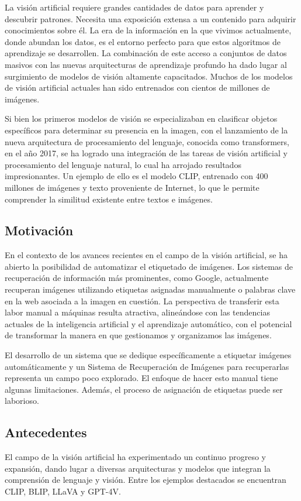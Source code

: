 La visi\'on artificial requiere grandes cantidades de datos para aprender y descubrir patrones. Necesita una exposici\'on extensa a un contenido para adquirir conocimientos sobre \'el. La era de la informaci\'on en la que vivimos actualmente, donde abundan los datos, es el entorno perfecto para que estos algoritmos de aprendizaje se desarrollen. La combinaci\'on de este acceso a conjuntos de datos masivos con las nuevas arquitecturas de aprendizaje profundo ha dado lugar al surgimiento de modelos de visi\'on altamente capacitados. Muchos de los modelos de visi\'on artificial actuales han sido entrenados con cientos de millones de im\'agenes.

Si bien los primeros modelos de visi\'on se especializaban en clasificar objetos espec\'ificos para determinar su presencia en la imagen, con el lanzamiento de la nueva arquitectura de procesamiento del lenguaje, conocida como transformers, en el a\~no 2017, se ha logrado una integraci\'on de las tareas de visi\'on artificial y procesamiento del lenguaje natural, lo cual ha arrojado resultados impresionantes. Un ejemplo de ello es el modelo CLIP, entrenado con 400 millones de im\'agenes y texto proveniente de Internet, lo que le permite comprender la similitud existente entre textos e im\'agenes.

\subsection*{Motivaci\'on}
En el contexto de los avances recientes en el campo de la visi\'on artificial, se ha abierto la posibilidad de automatizar el etiquetado de im\'agenes. Los sistemas de recuperaci\'on de informaci\'on m\'as prominentes, como Google, actualmente recuperan im\'agenes utilizando etiquetas asignadas manualmente o palabras clave en la web asociada a la imagen en cuesti\'on. La perspectiva de transferir esta labor manual a m\'aquinas resulta atractiva, aline\'andose con las tendencias actuales de la inteligencia artificial y el aprendizaje autom\'atico, con el potencial de transformar la manera en que gestionamos y organizamos las im\'agenes.

El desarrollo de un sistema que se dedique espec\'ificamente a etiquetar im\'agenes autom\'aticamente y un Sistema de Recuperaci\'on de Im\'agenes para recuperarlas representa un campo poco explorado. El enfoque de hacer esto manual tiene algunas limitaciones. Adem\'as, el proceso de asignaci\'on de etiquetas puede ser laborioso.

\subsection*{Antecedentes}
El campo de la visi\'on artificial ha experimentado un continuo progreso y expansi\'on, dando lugar a diversas arquitecturas y modelos que integran la comprensi\'on de lenguaje y visi\'on. Entre los ejemplos destacados se encuentran CLIP, BLIP, LLaVA y GPT-4V.

